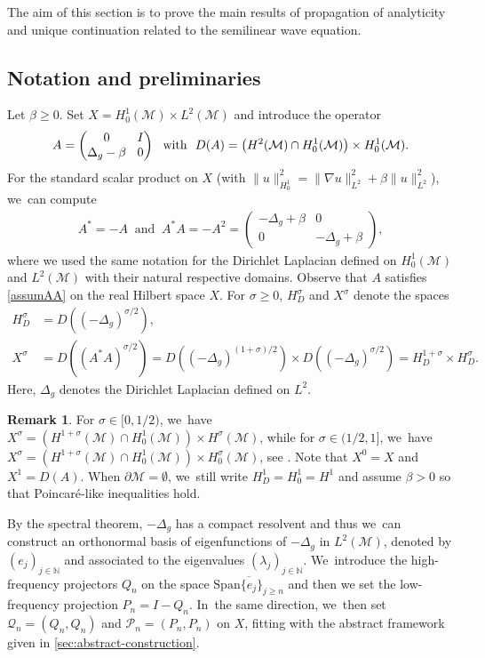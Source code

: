 \documentclass[JEP,XML,SOM,Unicode,published]{cedram}
\theoremstyle{definition}
\newtheorem{remark}[theorem]{Remark}
\let\mc\mathcal
\newcommand{\M}{\mc{M}}
\newcommand{\N}{\mathbb{N}}
\newcommand{\Q}{\mathcal{Q}}
\renewcommand{\P}{\mathcal{P}}
\providecommand{\norm}[1]{\lVert#1\rVert}
\begin{document}
The aim of this section is to prove the main results of propagation of analyticity and unique continuation related to the semilinear wave equation.

\subsection{Notation and preliminaries}\label{s:not_wave} Let $\beta\geq 0$. Set $X=H_0^1(\M)\times L^2(\M)$ and introduce the operator\vspace*{-3pt}
\begin{align*}\arraycolsep4.5pt
A=\begin{pmatrix}
0 & I \\
\Delta_g-\beta & 0
\end{pmatrix}\ \text{ with }\ D(A)=\big(H^2(\M)\cap H_0^1(\M)\big)\times H_0^1(\M).
\end{align*}
For the standard scalar product on $X$ (with $\norm{u}_{H^1_0}^2=\norm{\nabla u}_{L^2}^2+\beta \norm{u}_{L^2}^2$), we~can compute\vspace*{-3pt}
\begin{align*}
A^*=-A\ \text{ and }\ A^*A=-A^2=\begin{pmatrix}
-\Delta_g+\beta& 0 \\
0 & -\Delta_g+\beta
\end{pmatrix}\!,
\end{align*}
where we used the same notation for the Dirichlet Laplacian defined on $H^1_0(\M)$ and $L^2(\M)$ with their natural respective domains.
Observe that $A$ satisfies \cref{assumAA} on the real Hilbert space $X$. For $\sigma\geq 0$, $H^\sigma_D$ and $X^\sigma$ denote the spaces\vspace*{-3pt}
\begin{align}
\label{defSob}
H^\sigma_D&=D((-\Delta_g)^{\sigma/2}),\\
X^\sigma&= D((A^*A)^{\sigma/2})= D((-\Delta_g)^{(1+\sigma)/2})\times D((-\Delta_g)^{\sigma/2})=H^{1+\sigma}_D\times H^{\sigma}_D.
\end{align}
Here, $\Delta_g$ denotes the Dirichlet Laplacian defined on $L^2$.
\begin{remark}
For $\sigma \in [0,1/2)$, we~have $ X^\sigma=(H^{1+\sigma}(\M)\cap H_0^1(\M))\times H^\sigma(\M)$, while for $\sigma \in (1/2,1]$, we~have $ X^\sigma=(H^{1+\sigma}(\M)\cap H_0^1(\M))\times H_0^\sigma(\M)$, see \cite{G:67}. Note that $X^0=X$ and $X^1=D(A)$. When $\partial\M=\emptyset$, we~still write $H^1_D=H_0^1=H^1$ and assume $\beta>0$ so that Poincaré-like inequalities hold.
\end{remark}
By the spectral theorem, $-\Delta_g$ has a compact resolvent and thus we~can construct an orthonormal basis of eigenfunctions of $-\Delta_g$ in $L^2(\M)$, denoted by $(e_j)_{j\in \N}$ and associated to the eigenvalues $(\lambda_j)_{j\in \N}$. We~introduce the high-frequency projectors $Q_n$ on the space $\overline{\text{Span}\{e_j\}_{j\geq n}}$ and then we set the low-frequency projection $P_n=I-Q_n$. In~the same direction, we~then set $\Q_n=(Q_n, Q_n)$ and $\P_n=(P_n, P_n)$ on $X$, fitting with the abstract framework given in \cref{sec:abstract-construction}.
\end{document}

